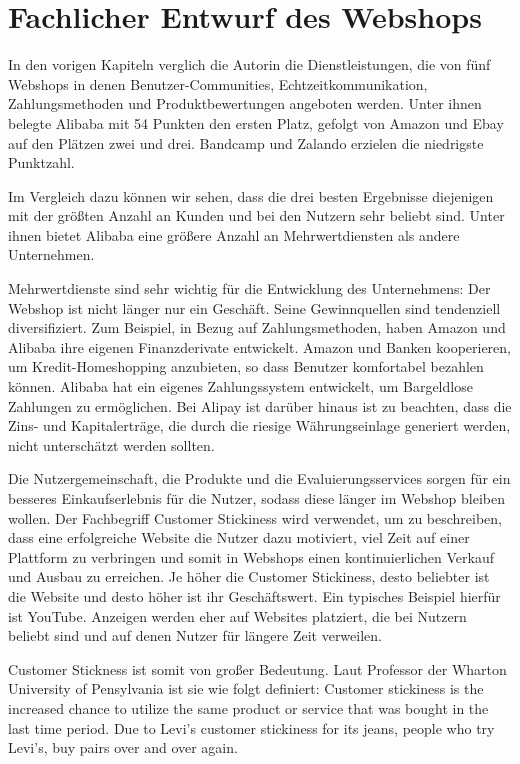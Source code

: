 
\chapter{Fachlicher Entwurf des Webshops}

In den vorigen Kapiteln verglich die Autorin die Dienstleistungen, die von fünf Webshops in denen Benutzer-Communities, Echtzeitkommunikation, Zahlungsmethoden und Produktbewertungen angeboten werden. Unter ihnen belegte Alibaba mit 54 Punkten den ersten Platz, gefolgt von Amazon und Ebay auf den Plätzen zwei und drei. Bandcamp und Zalando erzielen die niedrigste Punktzahl.

Im Vergleich dazu können wir sehen, dass die drei besten Ergebnisse diejenigen mit der größten Anzahl an Kunden und bei den Nutzern sehr beliebt sind. Unter ihnen bietet Alibaba eine größere Anzahl an Mehrwertdiensten als andere Unternehmen.

Mehrwertdienste sind sehr wichtig für die Entwicklung des Unternehmens: Der Webshop ist nicht länger nur ein Geschäft. Seine Gewinnquellen sind tendenziell diversifiziert. Zum Beispiel, in Bezug auf Zahlungsmethoden, haben Amazon und Alibaba ihre eigenen Finanzderivate entwickelt. Amazon und Banken kooperieren, um Kredit-Homeshopping anzubieten, so dass Benutzer komfortabel bezahlen können. Alibaba hat ein eigenes Zahlungssystem entwickelt, um \glqq{}Bargeldlose\grqq{} Zahlungen zu ermöglichen. Bei Alipay ist darüber hinaus ist zu beachten, dass die Zins- und Kapitalerträge, die durch die riesige Währungseinlage generiert werden, nicht unterschätzt werden sollten.

Die Nutzergemeinschaft, die Produkte und die Evaluierungsservices sorgen für ein besseres Einkaufserlebnis für die Nutzer, sodass diese länger im Webshop bleiben wollen. Der Fachbegriff Customer Stickiness wird verwendet, um zu beschreiben, dass eine erfolgreiche Website die Nutzer dazu motiviert, viel Zeit auf einer Plattform zu verbringen und somit in Webshops einen kontinuierlichen Verkauf und Ausbau zu erreichen. Je höher die Customer Stickiness, desto beliebter ist die Website und desto höher ist ihr Geschäftswert. Ein typisches Beispiel hierfür ist YouTube. Anzeigen werden eher auf Websites platziert, die bei Nutzern beliebt sind und auf denen Nutzer für längere Zeit verweilen.

Customer Stickness ist somit von großer Bedeutung. Laut \textcite{bradlow-wharton} Professor der Wharton University of Pensylvania ist sie wie folgt definiert: \glqq{}Customer stickiness is the increased chance to utilize the same product or service that was bought in the last time period. Due to Levi’s customer stickiness for its jeans, people who try Levi’s, buy pairs over and over again.\grqq{}

